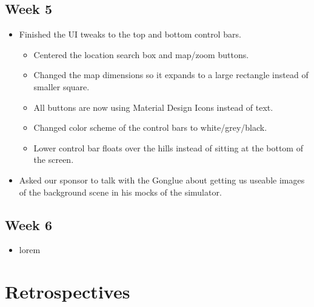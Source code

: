 \documentclass[10pt, onecolumn, draftclsnofoot, letterpaper, compsoc]{IEEEtran}
\begin{document}
\subsection{Week 5}

    \begin{itemize}

    \item Finished the UI tweaks to the top and bottom control bars.

        \begin{itemize}

            \item Centered the location search box and map/zoom buttons.

            \item Changed the map dimensions so it expands to a large rectangle instead of smaller square.

            \item All buttons are now using Material Design Icons instead of text.

            \item Changed color scheme of the control bars to white/grey/black.

            \item Lower control bar floats over the hills instead of sitting at the bottom of the screen.

        \end{itemize}

    \item Asked our sponsor to talk with the Gonglue about getting us useable images of the background
          scene in his mocks of the simulator.

    \end{itemize}

\subsection{Week 6}

    \begin{itemize}

    \item lorem

    \end{itemize}

\section{Retrospectives}
\end{document}
